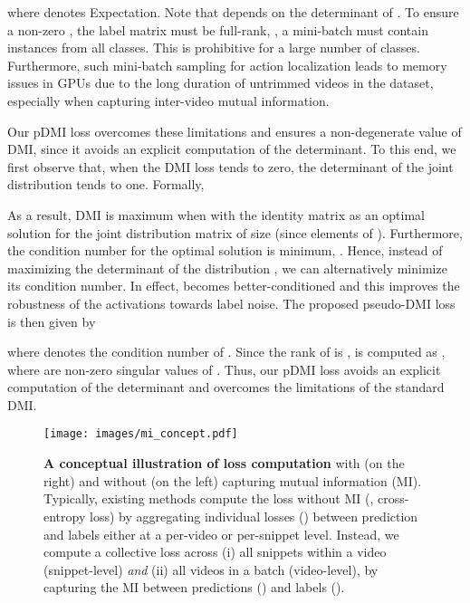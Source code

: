 \documentclass[final]{cvpr}
\begin{document}
where  denotes Expectation.
Note that  depends on the determinant of . To ensure a non-zero , the label matrix  must be full-rank, \ie, a mini-batch must contain instances from all classes. This is prohibitive for a large number of classes. Furthermore, such mini-batch sampling for action localization leads to memory issues in GPUs due to the long duration of untrimmed videos in the dataset, especially when capturing inter-video mutual information.

Our pDMI loss overcomes these limitations and ensures a non-degenerate value of DMI, since it avoids an explicit computation of the determinant.
To this end, we first observe that, when the DMI loss tends to zero, the determinant of the joint distribution tends to one.
Formally,

As a result, DMI is maximum when  with the identity matrix  as an optimal solution for the joint distribution matrix  of size  (since elements of ). Furthermore, the condition number  for the optimal solution  is minimum, \ie . Hence, instead of maximizing the determinant of the distribution , we can alternatively minimize its condition number. In effect,  becomes better-conditioned and this improves the robustness of the activations towards label noise. 
The proposed pseudo-DMI loss  is then given by

where  denotes the condition number of . Since the rank of  is ,  is computed as , where  are non-zero singular values of . Thus, our pDMI loss avoids an explicit computation of the determinant and overcomes the limitations of the standard DMI. 


\begin{figure}[t]
    \centering
    \texttt{[image: images/mi\_concept.pdf]}\vspace{-0.1cm}
    \caption{\label{fig:mi_concept}\textbf{A conceptual illustration of loss computation} with (on the right) and without (on the left) capturing mutual information (MI). Typically, existing methods compute the loss without MI (\eg, cross-entropy loss) by aggregating individual losses () between prediction  and labels  either at a per-video or per-snippet level. Instead, we compute a collective loss across (i) all snippets within a video (snippet-level) \textit{and} (ii) all videos in a batch (video-level), by capturing the MI between predictions () and labels ().\vspace{-0.25cm}}
\end{figure}
\end{document}
